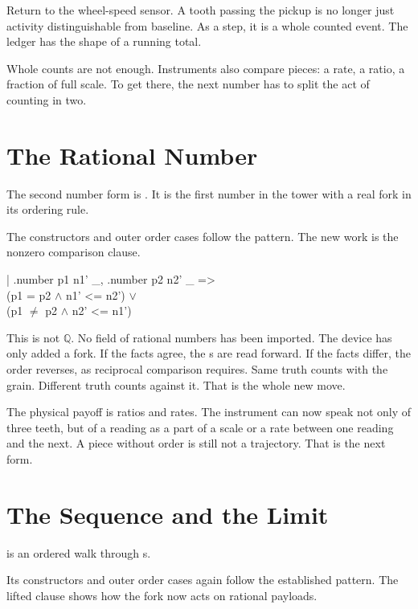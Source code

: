 Return to the wheel-speed sensor. A tooth passing the pickup is no longer just
activity distinguishable from baseline. As a  step, it is a
whole counted event. The ledger has the shape of a running total.

Whole counts are not enough. Instruments also compare pieces: a rate, a ratio,
a fraction of full scale. To get there, the next number has to split the act of
counting in two.

\section{The Rational Number}
\label{se:rational-number}

The second number form is . It is the first number in the tower
with a real fork in its ordering rule.

The constructors and outer order cases follow the  pattern. The
new work is the nonzero comparison clause.

\begin{leancode}
\quad | .number p1 n1' \_, .number p2 n2' \_ =>\\
\quad\quad (p1 = p2 \(\wedge\) n1' <= n2') \(\vee\)\\
\quad\quad (p1 \(\neq\) p2 \(\wedge\) n2' <= n1')
\end{leancode}

This is not \(\mathbb{Q}\). No field of rational numbers has been imported.
The device has only added a fork. If the facts agree, the s are
read forward. If the facts differ, the order reverses, as reciprocal
comparison requires. Same truth counts with the grain. Different truth counts
against it. That is the whole new move.

The physical payoff is ratios and rates. The instrument can now speak not only
of three teeth, but of a reading as a part of a scale or a rate between one
reading and the next. A piece without order is still not a trajectory. That is
the next form.

\section{The Sequence and the Limit}
\label{se:sequence-and-limit}

 is an ordered walk through s.

Its constructors and outer order cases again follow the established pattern.
The lifted clause shows how the fork now acts on rational payloads.

